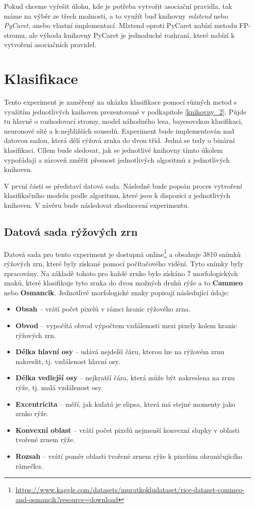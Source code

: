 Pokud chceme vyřešit úlohu, kde je potřeba vytvořit asociační pravidla, tak máme na výběr ze třech možnosti, a to využít buď knihovny \textit{mlxtend} nebo \textit{PyCaret}, anebo vlastní implementací. Mlxtend oproti PyCaret nabízí metodu FP-stromu, ale výhoda knihovny PyCaret je jednoduché rozhraní, které nabízí k vytvoření asociačních pravidel.

\section{Klasifikace}
Tento experiment je zaměřený na ukázku klasifikace pomocí různých metod s využitím jednotlivých knihoven prezentované v podkapitole \ref{knihovny_2}. Půjde tu hlavně o rozhodovací stromy, model náhodného lesa, bayesovskou klasifikaci, neuronové sítě a k-nejbližších sousedů. Experiment bude implementován nad datovou sadou, která dělí rýžová zrnka do dvou tříd. Jedná se tedy o binární klasifikaci. Cílem bude sledovat, jak se jednotlivé knihovny tímto úkolem vypořádají a zároveň změřit přesnost jednotlivých algoritmů z jednotlivých knihoven. 

V první části se představí datová sada. Následně bude popsán proces vytvoření klasifikačního modelu podle algoritmu, které jsou k dispozici z jednotlivých knihoven. V závěru bude následovat zhodnocení experimentu.

\subsection*{Datová sada rýžových zrn}
Datová sada pro tento experiment je dostupná online\footnote{\url{https://www.kaggle.com/datasets/muratkokludataset/rice-dataset-commeo-and-osmancik?resource=download}} a obsahuje 3810 snímků rýžových zrn, které byly získané pomocí počítačového vidění. Tyto snímky byly zpracovány. Na základě tohoto pro každé zrnko bylo získáno 7 morfologických znaků, které klasifikuje tyto zrnka do dvou možných druhů rýže a to \textbf{Cammeo} nebo \textbf{Osmancik}. Jednotlivé morfologické znaky popisují následující údaje: 

\begin{itemize}
    \item \textbf{Obsah} -- vrátí počet pixelů v rámci hranic rýžového zrna.
    \item \textbf{Obvod} -- vypočítá obvod výpočtem vzdálenosti mezi pixely kolem hranic rýžových zrn.
    \item \textbf{Délka hlavní osy} -- udává nejdelší čáru, kterou lze na rýžovém zrnu nakreslit, tj. vzdálenost hlavní osy.
    \item \textbf{Délka vedlejší osy} -- nejkratší čára, která může být nakreslena na zrnu rýže, tj. malá vzdálenost osy.
    \item \textbf{Excentricita} -- měří, jak kulatá je elipsa, která má stejné momenty jako zrnko rýže.
    \item \textbf{Konvexní oblast} -- vrátí počet pixelů nejmenší konvexní slupky v oblasti tvořené zrnem rýže.
    \item \textbf{Rozsah} -- vrátí poměr oblasti tvořené zrnem rýže k pixelům ohraničujícího rámečku.
\end{itemize}

